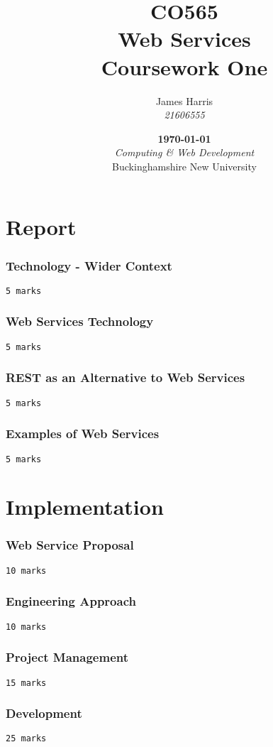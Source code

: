 \documentclass{report}
\title{
    \Large CO565\\
    Web Services\vspace*{.65cm}\\
    \huge Coursework One\vfill
}
\author{
    James Harris\\
    \textit{21606555}
}
\date{
    \vfill\textbf\today\\
    \vspace*{.75cm}\textit{Computing \& Web Development}\\
    Buckinghamshire New University
}
\begin{document}
    \maketitle
    \tableofcontents
    \part{Report}
    \section{Technology - Wider Context}
    \texttt{5 marks}
    \section{Web Services Technology}
    \texttt{5 marks}
    \section{REST as an Alternative to Web Services}
    \texttt{5 marks}
    \section{Examples of Web Services}
    \texttt{5 marks}

    \part{Implementation}
    \section{Web Service Proposal}
    \texttt{10 marks}
    \section{Engineering Approach}
    \texttt{10 marks}
    \section{Project Management}
    \texttt{15 marks}
    \section{Development}
    \texttt{25 marks}
\end{document}
